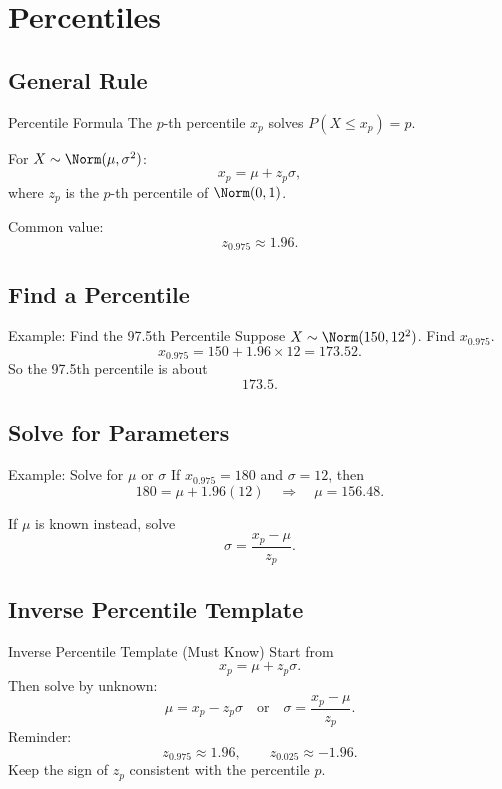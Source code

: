 \documentclass[aspectratio=169]{beamer}
\begin{document}
\section{Percentiles}

\subsection{General Rule}
\begin{frame}{Percentile Formula}
  The \(p\)-th percentile \(x_p\) solves \(P(X\le x_p)=p\).

  For \(X\sim\Norm(\mu,\sigma^2)\):
  \[
    x_p=\mu+z_p\sigma,
  \]
  where \(z_p\) is the \(p\)-th percentile of \(\Norm(0,1)\).

  Common value:
  \[
    z_{0.975}\approx1.96.
  \]
\end{frame}

\subsection{Find a Percentile}
\begin{frame}{Example: Find the 97.5th Percentile}
  Suppose \(X\sim\Norm(150,12^2)\). Find \(x_{0.975}\).
  \[
    x_{0.975}=150+1.96\times12=173.52.
  \]
  So the 97.5th percentile is about
  \[
    173.5.
  \]
\end{frame}

\subsection{Solve for Parameters}
\begin{frame}{Example: Solve for \(\mu\) or \(\sigma\)}
  If \(x_{0.975}=180\) and \(\sigma=12\), then
  \[
    180=\mu+1.96(12)
    \quad\Longrightarrow\quad
    \mu=156.48.
  \]

  If \(\mu\) is known instead, solve
  \[
    \sigma=\frac{x_p-\mu}{z_p}.
  \]
\end{frame}

\subsection{Inverse Percentile Template}
\begin{frame}{Inverse Percentile Template (Must Know)}
  Start from
  \[
    x_p=\mu+z_p\sigma.
  \]
  Then solve by unknown:
  \[
    \mu=x_p-z_p\sigma
    \quad\text{or}\quad
    \sigma=\frac{x_p-\mu}{z_p}.
  \]
  Reminder:
  \[
    z_{0.975}\approx1.96,\qquad z_{0.025}\approx-1.96.
  \]
  Keep the sign of \(z_p\) consistent with the percentile \(p\).
\end{frame}
\end{document}

